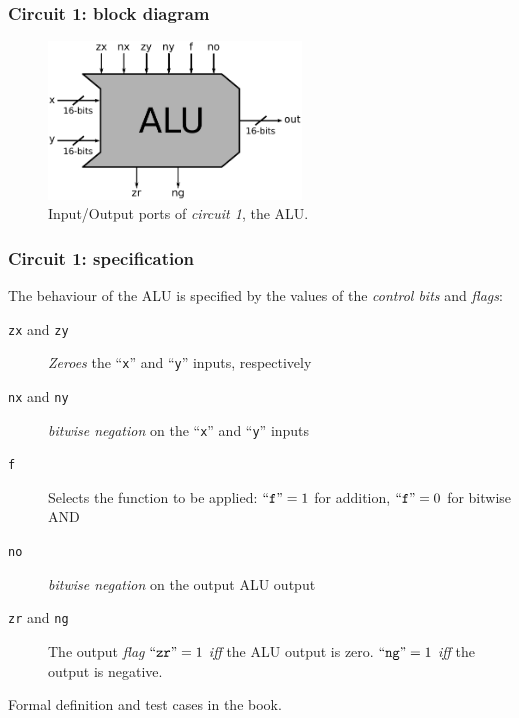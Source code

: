         \begin{frame}
            \frametitle{Circuit 1: block diagram}

            \begin{figure}[h!]
                \centerline{\includegraphics[width=0.6\textwidth]{imgs/alu-block.pdf}}
                \caption{Input/Output ports of \emph{circuit 1}, the ALU.
                    \label{fig:alu-block}}
            \end{figure}
        \end{frame}

        \begin{frame}
            \frametitle{Circuit 1: specification}

            \par{The behaviour of the ALU is specified by the values of the \emph{control bits} and \emph{flags}:}

            \begin{description}
                \item[\texttt{zx} and \texttt{zy}]
                    \emph{Zeroes} the ``\texttt{x}'' and ``\texttt{y}'' inputs, respectively
                \item[\texttt{nx} and \texttt{ny}]
                    \emph{bitwise negation} on the ``\texttt{x}'' and ``\texttt{y}'' inputs
                \item[\texttt{f}]
                    Selects the function to be applied: \newline
                    $\text{``\texttt{f}''} = 1$ for addition, $\text{``\texttt{f}''} = 0$ for bitwise AND
                \item[\texttt{no}]
                    \emph{bitwise negation} on the output ALU output
                \item[\texttt{zr} and \texttt{ng}]
                    The output \emph{flag} $\text{``\texttt{zr}''} = 1$ \emph{iff} the ALU output is zero.
                    $\text{``\texttt{ng}''} = 1$ \emph{iff} the output is negative.
            \end{description}

            \par{Formal definition and test cases in the book.}
        \end{frame}



